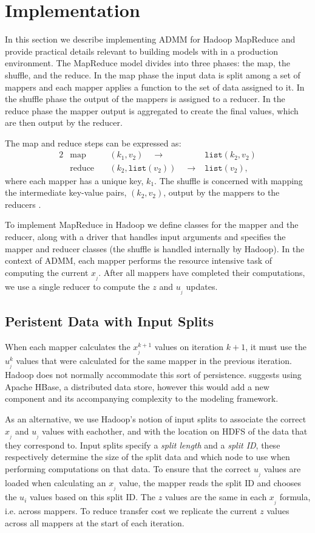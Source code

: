 \documentclass[10pt, conference, compsocconf]{IEEEtran}
\begin{document}
\section{Implementation}\label{sec:imp}
In this section we describe implementing ADMM for Hadoop MapReduce and provide practical details relevant to building models with in a production environment.  The MapReduce model divides into three phases: the map, the shuffle, and the reduce.  In the map phase the input data is split among a set of mappers and each mapper applies a function to the set of data assigned to it.  In the shuffle phase the output of the mappers is assigned to a reducer.  In the reduce phase the mapper output is aggregated to create the final values, which are then output by the reducer.

The map and reduce steps can be expressed as:
\begin{alignat*}{2}
&\text{map}\quad &(k_1,v_2)\quad\rightarrow &\texttt{list}(k_2,v_2)\\
&\text{reduce}\quad &(k_2,\texttt{list}(v_2))\quad\rightarrow &\texttt{list}(v_2),
\end{alignat*}
where each mapper has a unique key, $k_1$.  The shuffle is concerned with mapping the intermediate key-value pairs, $(k_2,v_2)$, output by the mappers to the reducers \cite{dean2004}.

To implement MapReduce in Hadoop we define classes for the mapper and the reducer, along with a driver that handles input arguments and specifies the mapper and reducer classes (the shuffle is handled internally by Hadoop).  In the context of ADMM, each mapper performs the resource intensive task of computing the current $x_{_j}$.  After all mappers have completed their computations, we use a single reducer to compute the $z$ and $u_{_j}$ updates.

\subsection{Peristent Data with Input Splits}
When each mapper calculates the $x_{_j}^{k+1}$ values on iteration $k+1$, it must use the $u_{_j}^k$ values that were calculated for the same mapper in the previous iteration.  Hadoop does not normally accommodate this sort of persistence.  \cite{boyd} suggests using Apache HBase, a distributed data store, however this would add a new component and its accompanying complexity to the modeling framework.

As an alternative, we use Hadoop's notion of input splits to associate the correct $x_{_j}$ and $u_{_j}$ values with eachother, and with the location on HDFS of the data that they correspond to.  Input splits specify a \emph{split length} and a \emph{split ID}, these respectively determine the size of the split data and which node to use when performing computations on that data.  To ensure that the correct $u_{_j}$ values are loaded when calculating an $x_{_j}$ value, the mapper reads the split ID and chooses the $u_i$ values based on this split ID.  The $z$ values are the same in each $x_{_j}$ formula, i.e. across mappers.  To reduce transfer cost we replicate the current $z$ values across all mappers at the start of each iteration.
\end{document}
